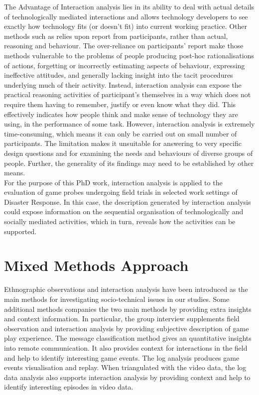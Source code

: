 The Advantage of Interaction analysis lies in its ability to deal with actual details of technologically mediated interactions and allows technology developers to see exactly how technology fits (or doesn't fit) into current working practice. Other methods such as relies upon report from participants, rather than actual, reasoning and behaviour. The over-reliance on participants' report make those methods vulnerable to the problems of people producing post-hoc rationalisations of actions, forgetting or incorrectly estimating aspects of behaviour, expressing ineffective attitudes, and generally lacking insight into the tacit procedures underlying much of their activity. Instead, interaction analysis can expose the practical reasoning activities of participant's themselves in a way which does not require them having to remember, justify or even know what they did. This effectively indicates how people think and make sense of technology they are using, in the performance of some task. However, interaction analysis is extremely time-consuming, which means it can only be carried out on small number of participants. The limitation makes it unsuitable for answering to very specific design questions and for examining the needs and behaviours of diverse groups of people. Further, the generality of its findings may need to be established by other means.\\

For the purpose of this PhD work, interaction analysis is applied to the evaluation of game probes undergoing field trials in selected work settings of Disaster Response. In this case, the description generated by interaction analysis could expose information on the sequential organisation of technologically and socially mediated activities, which in turn, reveals how the activities can be supported.\\

\section{Mixed Methods Approach}
Ethnographic observations and interaction analysis have been introduced as the main methods for investigating socio-technical issues in our studies. Some additional methods companies the two main methods by providing extra insights and context information. In particular, the group interview supplements field observation and interaction analysis by providing subjective description of game play experience. The message classification method gives an quantitative insights into remote communication. It also provides context for interactions in the field and help to identify interesting game events. The log analysis produces game events visualisation and replay. When triangulated with the video data, the log data analysis also supports interaction analysis by providing context and help to identify interesting episodes in video data.

